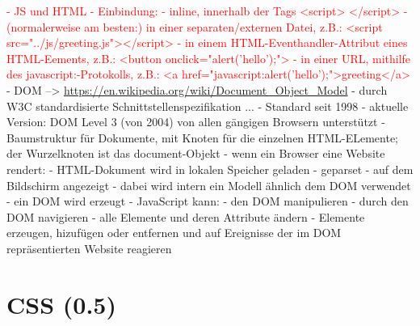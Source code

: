 \documentclass[a4paper, 12pt, hidelinks, listof=totoc, listoftables=totoc, bibliography=totoc]{scrreprt}
\newcommand{\TODO}[1]{\textcolor{red}{#1}\newline}
\begin{document}
\TODO{- JS und HTML
	- Einbindung:
		- inline, innerhalb der Tags <script> </script>
		- (normalerweise am besten:) in einer separaten/externen Datei, z.B.: <script src="../js/greeting.js"></script>
		- in einem HTML-Eventhandler-Attribut eines HTML-Eements, z.B.: <button onclick="alert('hello');">
		- in einer URL, mithilfe des javascript:-Protokolls, z.B.: <a href="javascript:alert('hello');">greeting</a>
}
- \ac{DOM}  --> \url{https://en.wikipedia.org/wiki/Document_Object_Model}
	- durch W3C standardisierte Schnittstellenspezifikation ...
	- Standard seit 1998
	- aktuelle Version: \ac{DOM} Level 3 (von 2004) von allen gängigen Browsern unterstützt
	- Baumstruktur für Dokumente, mit Knoten für die einzelnen HTML-ELemente; der Wurzelknoten ist das document-Objekt
	- wenn ein Browser eine Website rendert:
		- HTML-Dokument wird in lokalen Speicher geladen
		- geparset
		- auf dem Bildschirm angezeigt
		- dabei wird intern ein Modell ähnlich dem \ac{DOM} verwendet
		- ein \ac{DOM} wird erzeugt
	- JavaScript kann:
		- den \ac{DOM} manipulieren
		- durch den \ac{DOM} navigieren
		- alle Elemente und deren Attribute ändern
		- Elemente erzeugen, hizufügen oder entfernen und auf Ereignisse der im \ac{DOM} repräsentierten Website reagieren



\section{CSS (0.5)}
\end{document}
